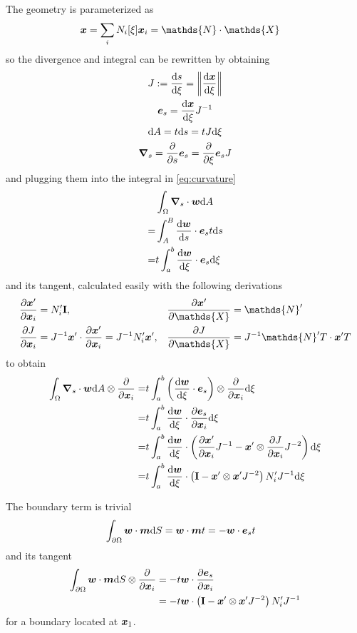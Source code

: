 \documentclass[a4paper,11pt]{article}
\renewcommand{\to}[1]{\text{\boldmath $#1$}} %
\newcommand{\ts}[1]{\text{\boldmath $\mathrm{#1}$}} %
\newcommand{\um}[1]{\mathds{#1}}
\newcommand{\intd}[1]{\mathrm{d}#1}
\newcommand{\pderiv}[2]{\frac{\partial#1}{\partial#2}}
\newcommand{\dderiv}[2]{\frac{\mathrm{d}#1}{\mathrm{d}#2}}
\newcommand{\norm}[1]{\left\lVert{#1}\right\rVert}
\newcommand{\T}{\mathrm{T}}
\newcommand{\defeq}{:=}
\begin{document}
The geometry is parameterized as
\begin{align}
 \to x &= \sum_i N_i[\xi]\to x_i  = \um N \cdot \um X
\end{align}
so the divergence and integral can be rewritten by obtaining
\begin{gather}
 J \defeq \dderiv{s}{\xi} = \norm{\dderiv{\to x}{\xi}}\\
 \to e_s = \dderiv{\to x}{\xi} J^{-1}\\
 \intd A = t \intd s = t J \intd \xi\\
 \to \nabla_s = \pderiv{}{s}\to e_s = \pderiv{}{\xi}\to e_s J
\end{gather}
and plugging them into the integral in \eqref{eq:curvature}
\begin{align}
  &\int_\Omega\to \nabla_s\cdot\to w\intd A\\
 =&\int_A^B\dderiv{\to w}{s}\cdot\to e_s t \intd s\\
 =&t \int_a^b \dderiv{\to w}{\xi}\cdot \to e_s \intd\xi\\
\end{align}
and its tangent, calculated easily with the following derivations
\begin{align}
 \pderiv{\to x'}{\to x_i} &= N_i' \ts I, & \pderiv{\to x'}{\um X} &= \um N'\\
 \pderiv{J}{\to x_i} &= J^{-1} \to x'\cdot \pderiv{\to x'}{\to x_i} = J^{-1} N_i' \to x', & \pderiv{J}{\um X} &= J^{-1} \um N'^\T \cdot \to x'^\T
\end{align}
to obtain
\begin{align}
 \int_\Omega\to \nabla_s\cdot\to w\intd A \otimes \pderiv{}{\to x_i}
 =&t \int_a^b \left(\dderiv{\to w}{\xi}\cdot \to e_s\right)\otimes \pderiv{}{\to x_i}  \intd\xi\\
 =&t \int_a^b \dderiv{\to w}{\xi}\cdot \pderiv{\to e_s}{\to x_i} \intd\xi\\
 =&t \int_a^b \dderiv{\to w}{\xi}\cdot \left(\pderiv{\to x'}{\to x_i}J^{-1}-\to x'\otimes\pderiv{J}{\to x_i}J^{-2}\right) \intd\xi\\
 =&t \int_a^b \dderiv{\to w}{\xi}\cdot \left(\ts I-\to x'\otimes\to x' J^{-2}\right)N_i' J^{-1} \intd\xi
\end{align}

The boundary term is trivial
\begin{align}
 &\int_{\partial\Omega} \to w\cdot \to m\intd S = \to w \cdot\to m t = - \to w \cdot \to e_s t
\end{align}
and its tangent
\begin{align}
 \int_{\partial\Omega} \to w\cdot \to m\intd S\otimes \pderiv{}{\to x_i} &= -t \to w\cdot\pderiv{\to e_s}{\to x_i}\\
 &= -t \to w\cdot \left(\ts I-\to x'\otimes\to x' J^{-2}\right)N_i' J^{-1}
\end{align}
for a boundary located at $\to x_1$.
\end{document}
